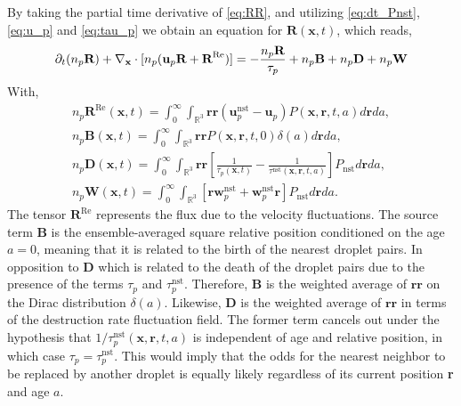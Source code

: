 By taking the partial time derivative of \ref{eq:RR}, and utilizing \ref{eq:dt_Pnst}, \ref{eq:u_p} and \ref{eq:tau_p} we obtain an equation for $\textbf{R}(\textbf{x},t)$, which reads,
\begin{equation}
    \pddt (n_p\textbf{R})
    + \pddx \cdot [n_p(\textbf{u}_p\textbf{R}
    + \textbf{R}^\text{Re})]
    = 
    - \frac{n_p\textbf{R}}{\tau_p}
    +n_p\textbf{B}
    + n_p\textbf{D}
    + n_p\textbf{W}
    \label{eq:dt_R}
\end{equation}
With,
\begin{align*}
    n_p \textbf{R}^\text{Re}(\textbf{x},t)
    =
    \int_{0}^\infty
    \int_{\mathbb{R}^3}
    \textbf{rr}(\textbf{u}^\text{nst}_p - \textbf{u}_p)
    P(\textbf{x},\textbf{r},t,a)
    d\textbf{r}da,\\
    n_p \textbf{B}(\textbf{x},t)
    =
    \int_{0}^\infty
    \int_{\mathbb{R}^3}
    \textbf{rr}
    P(\textbf{x},\textbf{r},t,0)\delta(a)
    d\textbf{r}da, \\
    n_p\textbf{D}(\textbf{x},t) = 
    \int_{0}^\infty
    \int_{\mathbb{R}^3} \textbf{rr}
    \left[
        \frac{1}{\tau_p(\textbf{x},t)}
        - \frac{1}{\tau^\text{nst}(\textbf{x},\textbf{r},t,a)}
    \right]
    P_\text{nst}
    d\textbf{r}
    da,\\
    n_p \textbf{W}(\textbf{x},t) = 
    \int_{0}^\infty
    \int_{\mathbb{R}^3} \left[
        \textbf{r} \textbf{w}^\text{nst}_p
        + \textbf{w}^\text{nst}_p\textbf{r}
    \right]P_\text{nst}
    d\textbf{r}
    da.
\end{align*} 
The tensor $\textbf{R}^\text{Re}$ represents the flux due to the velocity fluctuations. 
The source term $\textbf{B}$ is the ensemble-averaged square relative position conditioned on the age $a=0$, meaning that it is related to the birth of the nearest droplet pairs. 
In opposition to \textbf{D} which is related to the death of the droplet pairs due to the presence of the terms $\tau_p$ and $\tau_p^\text{nst}$.
Therefore, $\textbf{B}$ is the weighted average of $\textbf{rr}$ on the Dirac distribution $\delta(a)$. 
Likewise, $\textbf{D}$ is the weighted average of $\textbf{rr}$ in terms of the destruction rate fluctuation field. 
The former term cancels out under the hypothesis that $1 / \tau^\text{nst}_p(\textbf{x},\textbf{r},t,a)$ is independent of age and relative position, in which case $\tau_p = \tau^\text{nst}_p$. 
This would imply that the odds for the nearest neighbor to be replaced by another droplet is equally likely regardless of its current position \textbf{r} and age $a$. 
